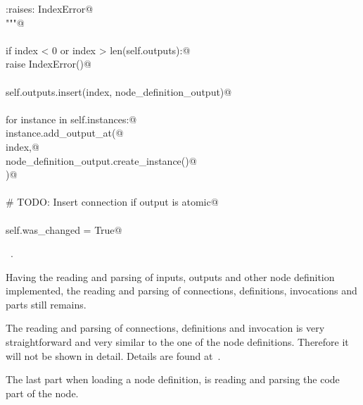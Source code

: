 \documentclass[
    a4paper,      %
    10pt,         %
    openright,    %
    notitlepage,  %
    parskip=half, %
]{scrreprt}       %
\theoremstyle{definition}                    %
\begin{document}
\begin{flushleft}
\begin{minipage}{\linewidth}
\begin{list}{}{}
\mbox{}\lstinline@    :raises: IndexError@\\
\mbox{}\lstinline@    """@\\
\mbox{}\lstinline@@\\
\mbox{}\lstinline@    if index < 0 or index > len(self.outputs):@\\
\mbox{}\lstinline@        raise IndexError()@\\
\mbox{}\lstinline@@\\
\mbox{}\lstinline@    self.outputs.insert(index, node_definition_output)@\\
\mbox{}\lstinline@@\\
\mbox{}\lstinline@    for instance in self.instances:@\\
\mbox{}\lstinline@        instance.add_output_at(@\\
\mbox{}\lstinline@            index,@\\
\mbox{}\lstinline@            node_definition_output.create_instance()@\\
\mbox{}\lstinline@        )@\\
\mbox{}\lstinline@@\\
\mbox{}\lstinline@    # TODO: Insert connection if output is atomic@\\
\mbox{}\lstinline@@\\
\mbox{}\lstinline@    self.was_changed = True@{\NWsep}
\end{list}
\vspace{-1.5ex}
\footnotesize
\begin{list}{}{\setlength{\itemsep}{-\parsep}\setlength{\itemindent}{-\leftmargin}}
\item \NWtxtMacroRefIn\ .

\item{}
\end{list}
\end{minipage}\vspace{4ex}
\end{flushleft}
Having the reading and parsing of inputs, outputs and other node definition
implemented, the reading and parsing of connections, definitions, invocations
and parts still remains.

The reading and parsing of connections, definitions and invocation is very
straightforward and very similar to the one of the node definitions. Therefore
it will not be shown in detail. Details are found at~.

The last part when loading a node definition, is reading and parsing the code
part of the node.
\end{document}
